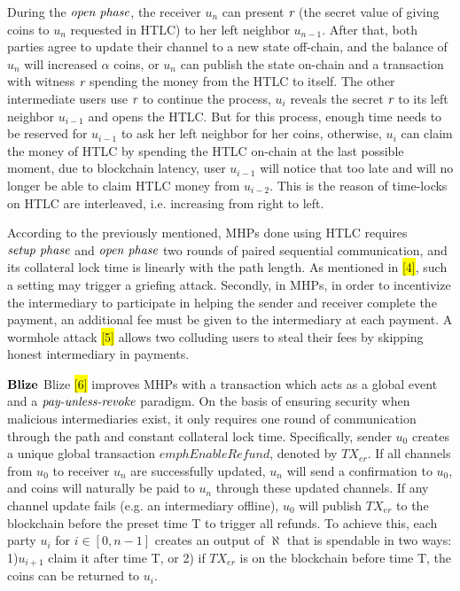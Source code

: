 \documentclass[conference]{IEEEtran}
\begin{document}
During the $\emph{open phase}$, the receiver $u_n$ can present $\emph{r}$ (the secret value of giving coins to $u_n$ requested in HTLC) to her left neighbor $u_{n-1}$. After that, both parties agree to update their channel to a new state off-chain, and the balance of $u_n$ will increased $\alpha$ coins, or $u_n$ can publish the state on-chain and a transaction with witness $\emph{r}$ spending the money from the HTLC to itself. The other intermediate users use $\emph{r}$ to continue the process, $u_i$ reveals the secret $\emph{r}$ to its left neighbor $u_{i-1}$ and opens the HTLC. But for this process, enough time needs to be reserved for $u_{i-1}$ to ask her left neighbor for her coins, otherwise, $u_i$ can claim the money of HTLC by spending the HTLC on-chain at the last possible moment, due to blockchain latency, user $u_{i-1}$ will notice that too late and will no longer be able to claim HTLC money from $u_{i-2}$. This is the reason of time-locks on HTLC are interleaved, i.e. increasing from right to left.

According to the previously mentioned, MHPs done using HTLC requires $\emph{setup phase}$ and $\emph{open phase}$ two rounds of paired sequential communication, and its collateral lock time is linearly with the path length. As mentioned in \colorbox{yellow}{[4]}, such a setting may trigger a griefing attack. Secondly, in MHPs, in order to incentivize the intermediary to participate in helping the sender 
and receiver complete the payment, an additional fee must be given to the intermediary at each payment. A wormhole attack \colorbox{yellow}{[5]} allows two colluding users to steal their fees by skipping honest intermediary in payments.

\noindent $\bf{Blize}$   Blize \colorbox{yellow}{[6]} improves MHPs with a transaction which acts as a global event and a $\emph{pay-unless-revoke}$ paradigm. On the basis of ensuring security when malicious intermediaries exist, it only requires one round of communication through the path and constant collateral lock time. Specifically, sender $u_0$ creates a unique global transaction $emph{Enable Refund}$, denoted 
by $TX_{er}$. If all channels from $u_0$ to receiver $u_n$ are successfully updated, $u_n$ will send a confirmation to $u_0$, and coins will naturally be paid to $u_n$ through these updated channels. If any channel update fails (e.g. an intermediary offline), $u_0$ will publish $TX_{er}$ to the blockchain before the preset time T to trigger all refunds. To achieve this, each party $u_i$ for $i \in [0,n-1]$ 
creates an output of $\aleph$ that is spendable in two ways: 1)$u_{i+1}$ claim it after time T, or 2) if $TX_{er}$ is on the blockchain before time T, the coins can be returned to $u_i$.
\end{document}
